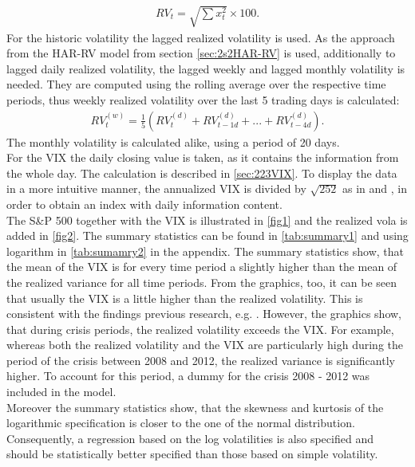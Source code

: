 \begin{align}
RV_{t} = \sqrt{\sum x_{t}^{2}} \times 100.
\end{align}
For the historic volatility the lagged realized volatility is used. As the approach from the HAR-RV model from section \ref{sec:2s2HAR-RV} is used, additionally to lagged daily realized volatility, the lagged weekly and lagged monthly volatility is needed. They are computed using the rolling average over the respective time periods, thus weekly realized volatility over the last 5 trading days is calculated:
\begin{align}
RV_{t}^{(w)} = \frac{1}{5} (RV_{t}^{(d)} + RV_{t-1d}^{(d)} + ... + RV_{t-4d}^{(d)}).
\end{align}
The monthly volatility is calculated alike, using a period of 20 days.\\
For the \ac{VIX} the daily closing value is taken, as it contains the information from the whole day. The calculation is described in \ref{sec:223VIX}. To display the data in a more intuitive manner, the annualized \ac{VIX} is divided by $\sqrt{252}$ as in \textcite{blair2001} and \textcite{whaley2008}, in order to obtain an index with daily information content.\\
The S\&P 500 together with the \ac{VIX} is illustrated in \ref{fig1} and the realized vola is added in \ref{fig2}. The summary statistics can be found in \ref{tab:summary1} and using logarithm in \ref{tab:sumamry2} in the appendix. The summary statistics show, that the mean of the \ac{VIX} is for every time period a slightly higher than the mean of the realized variance for all time periods. From the graphics, too, it can be seen that usually the \ac{VIX} is a little higher than the realized volatility. This is consistent with the findings previous research, e.g. \textcite{jiang2003}. However, the graphics show, that during crisis periods, the realized volatility exceeds the \ac{VIX}. For example, whereas both the realized volatility and the \ac{VIX} are particularly high during the period of the crisis between 2008 and 2012, the realized variance is significantly higher. To account for this period, a dummy for the crisis 2008 - 2012 was included in the model.\\ Moreover the summary statistics show, that the skewness and kurtosis of the logarithmic specification is closer to the one of the normal distribution. Consequently, a regression based on the log volatilities is also specified and should be statistically better specified than those based on simple volatility.\\
